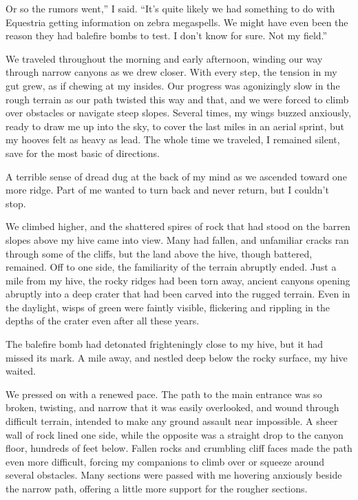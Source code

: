 \leavevmode{}Or so the rumors went,” I said. “It’s quite likely we had something to do with Equestria getting information on zebra megaspells. We might have even been the reason they had balefire bombs to test. I don’t know for sure. Not my field.”

We traveled throughout the morning and early afternoon, winding our way through narrow canyons as we drew closer. With every step, the tension in my gut grew, as if chewing at my insides. Our progress was agonizingly slow in the rough terrain as our path twisted this way and that, and we were forced to climb over obstacles or navigate steep slopes. Several times, my wings buzzed anxiously, ready to draw me up into the sky, to cover the last miles in an aerial sprint, but my hooves felt as heavy as lead. The whole time we traveled, I remained silent, save for the most basic of directions.

A terrible sense of dread dug at the back of my mind as we ascended toward one more ridge. Part of me wanted to turn back and never return, but I couldn’t stop.

We climbed higher, and the shattered spires of rock that had stood on the barren slopes above my hive came into view. Many had fallen, and unfamiliar cracks ran through some of the cliffs, but the land above the hive, though battered, remained. Off to one side, the familiarity of the terrain abruptly ended. Just a mile from my hive, the rocky ridges had been torn away, ancient canyons opening abruptly into a deep crater that had been carved into the rugged terrain. Even in the daylight, wisps of green were faintly visible, flickering and rippling in the depths of the crater even after all these years.

The balefire bomb had detonated frighteningly close to my hive, but it had missed its mark. A mile away, and nestled deep below the rocky surface, my hive waited.

We pressed on with a renewed pace. The path to the main entrance was so broken, twisting, and narrow that it was easily overlooked, and wound through difficult terrain, intended to make any ground assault near impossible. A sheer wall of rock lined one side, while the opposite was a straight drop to the canyon floor, hundreds of feet below. Fallen rocks and crumbling cliff faces made the path even more difficult, forcing my companions to climb over or squeeze around several obstacles. Many sections were passed with me hovering anxiously beside the narrow path, offering a little more support for the rougher sections.

